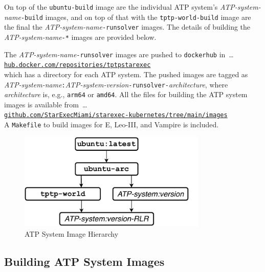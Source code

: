 \documentclass{easychair}
\begin{document}
On top of the {\tt ubuntu-build} image are the individual ATP system's
{\em ATP-system-name}{\tt-build} images, and on top of that with the {\tt tptp-world-build} image 
are the final the {\em ATP-system-name}{\tt -runsolver} images.
The details of building the {\em ATP-system-name}{\tt -*} images are provided below.

The {\em ATP-system-name}{\tt -runsolver} images are pushed to {\tt dockerhub} in~\ldots\\
\hspace*{1cm}\href{https://hub.docker.com/repositories/tptpstarexec}{\tt hub.docker.com/repositories/tptpstarexec}\\
which has a directory for each ATP system.
The pushed images are tagged as 
{\em ATP-system-name}{\tt :}{\em ATP-system-version}{\tt -runsolver-}{\em architecture},
where {\em architecture} is, e.g., {\tt arm64} or {\tt amd64}.
All the files for building the ATP system images is available from~\ldots \\
\hspace*{1cm}\href{https://github.com/StarExecMiami/starexec-kubernetes/tree/main/images}{\tt github.com/StarExecMiami/starexec-kubernetes/tree/main/images}\\
A {\tt Makefile} to build images for E, Leo-III, and Vampire is included.

\begin{figure}[htb]
\begin{center}
\includegraphics[width=0.8\textwidth]{ImageDAG}
\caption{ATP System Image Hierarchy}
\label{ImageDAG}
\end{center}
\end{figure}

\subsection{Building ATP System Images}
\label{BuildingATPSystemImages}
\end{document}
